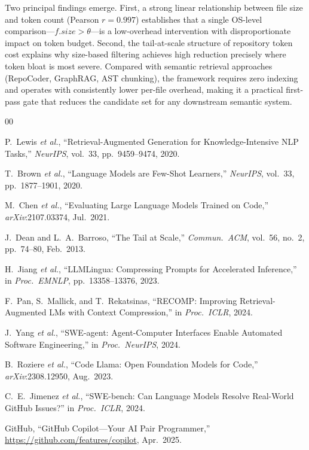 \documentclass[conference]{IEEEtran}
\begin{document}
Two principal findings emerge. First, a strong linear relationship
between file size and token count (Pearson $r{=}0.997$) establishes
that a single OS-level comparison---$f.\mathit{size} > \theta$---is a
low-overhead intervention with disproportionate impact on token budget.
Second, the tail-at-scale structure of repository token cost explains
why size-based filtering achieves high reduction precisely where token
bloat is most severe. Compared with semantic retrieval approaches
(RepoCoder, GraphRAG, AST chunking), the framework requires zero
indexing and operates with consistently lower per-file overhead,
making it a practical first-pass gate that reduces the candidate set
for any downstream semantic system.

\begin{thebibliography}{00}

P.~Lewis \emph{et al.}, ``Retrieval-Augmented Generation for
Knowledge-Intensive NLP Tasks,'' \emph{NeurIPS}, vol.~33,
pp.~9459--9474, 2020.

T.~Brown \emph{et al.}, ``Language Models are Few-Shot Learners,''
\emph{NeurIPS}, vol.~33, pp.~1877--1901, 2020.

M.~Chen \emph{et al.}, ``Evaluating Large Language Models Trained on
Code,'' \emph{arXiv}:2107.03374, Jul.~2021.

J.~Dean and L.~A.~Barroso, ``The Tail at Scale,''
\emph{Commun.\ ACM}, vol.~56, no.~2, pp.~74--80, Feb.~2013.

H.~Jiang \emph{et al.}, ``LLMLingua: Compressing Prompts for
Accelerated Inference,'' in \emph{Proc.\ EMNLP},
pp.~13358--13376, 2023.

F.~Pan, S.~Mallick, and T.~Rekatsinas, ``RECOMP: Improving
Retrieval-Augmented LMs with Context Compression,''
in \emph{Proc.\ ICLR}, 2024.

J.~Yang \emph{et al.}, ``SWE-agent: Agent-Computer Interfaces Enable
Automated Software Engineering,'' in \emph{Proc.\ NeurIPS}, 2024.

B.~Roziere \emph{et al.}, ``Code Llama: Open Foundation Models for
Code,'' \emph{arXiv}:2308.12950, Aug.~2023.

C.~E.~Jimenez \emph{et al.}, ``SWE-bench: Can Language Models Resolve
Real-World GitHub Issues?'' in \emph{Proc.\ ICLR}, 2024.

GitHub, ``GitHub Copilot---Your AI Pair Programmer,''
\url{https://github.com/features/copilot}, Apr.~2025.


\end{thebibliography}
\end{document}
